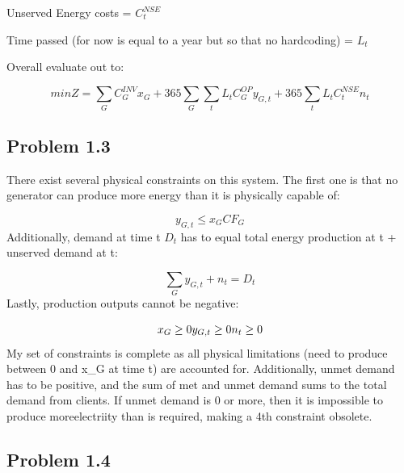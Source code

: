 \documentclass[12pt,a4paper]{article}
\begin{document}
Unserved Energy costs  = $C_t^{NSE}$ 

Time passed (for now is equal to a year but so that no hardcoding) = $L_t$

Overall evaluate out to:

\[
min Z = \sum_G C_G^{INV} x_G + 365 \sum_G \sum_t L_t C_G^{OP} y_{G,t} + 365 \sum_t L_t C_t^{NSE} n_t
\]
\subsection{Problem 1.3}
There exist several physical constraints on this system. The first one is that no generator can produce more energy than it is physically capable of:

\[
y_{G,t}\ensuremath{\leq} x_G CF_G
\]
Additionally, demand at time t $D_t$ has to equal total energy production at t + unserved demand at t:

\[
\sum_G y_{G,t} + n_t = D_t
\]
Lastly, production outputs cannot be negative:

\[
x_G \ensuremath{\geq} 0 \\
y_{G,t} \ensuremath{\geq} 0 \\
n_t \ensuremath{\geq} 0 \\
\]
My set of constraints is complete as all physical limitations (need to produce between 0 and x\_G at time t) are accounted for. Additionally, unmet demand has to be positive, and the sum of met and unmet demand sums to the total demand from clients. If unmet demand is 0 or more, then  it is impossible to produce moreelectriity than is required, making a 4th constraint obsolete.

\subsection{Problem 1.4}
\end{document}
